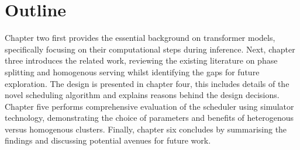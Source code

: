 \section{Outline}

Chapter two first provides the essential background on transformer models, specifically focusing on their computational steps during inference.
Next, chapter three introduces the related work, reviewing the existing literature on phase splitting and homogenous serving whilst identifying the gaps for future exploration.
The design is presented in chapter four, this includes details of the novel scheduling algorithm and explains reasons behind the design decisions.
Chapter five performs comprehensive evaluation of the scheduler using simulator technology, demonstrating the choice of parameters and benefits of heterogenous versus homogenous clusters.
Finally, chapter six concludes by summarising the findings and discussing potential avenues for future work.

